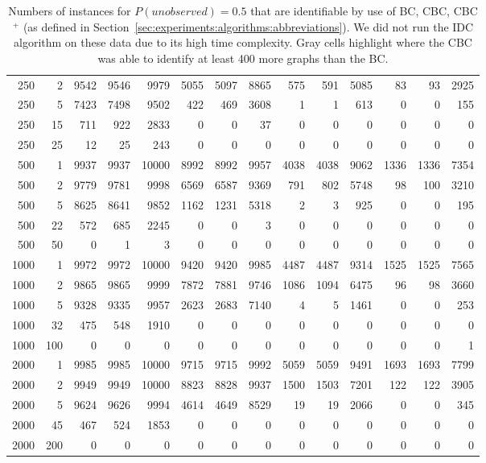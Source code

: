 \begin{table}
\begin{center}
\begin{tabular}{|rr | rrr| rrr| rrr| rrr|}
250&2&
9542&9546&9979&5055&5097&8865&575&591&5085&83&93&2925\\
250&5&
7423&7498&9502&422&469&3608&1&1&613&0&0&155\\
250&15&
711&922&2833&          0&0&37&        0&0&0&          0&0&0\\
250&25&
12&25&243&0&0&0&0&0&0&0&0&0\\
\hline
500&1&
9937&9937&10000&8992&8992&9957&4038&4038&9062&1336&1336&7354\\
500&2&
9779&9781&9998&6569&6587&9369&791&802&5748&98&100&3210\\
500&5&
8625&8641&9852&1162&1231&5318&2&3&925&0&0&195\\
500&22&
572&685&2245&0&0&3&0&0&0&0&0&0\\
500&50&
0&1&3&0&0&0&0&0&0&0&0&0\\
\hline
1000&1&
9972&9972&10000&9420&9420&9985&4487&4487&9314&1525&1525&7565\\
1000&2&
9865&9865&9999&7872&7881&9746&1086&1094&6475&96&98&3660\\
1000&5&
9328&9335&9957&2623&2683&7140&4&5&1461&0&0&253\\
1000&32&
475&548&1910&0&0&0&0&0&0&0&0&0\\
1000&100&
0&0&0&0&0&0&0&0&0&0&0&1\\
\hline
2000&1&
9985&9985&10000&9715&9715&9992&5059&5059&9491&1693&1693&7799\\
2000&2&
9949&9949&10000&8823&8828&9937&1500&1503&7201&122&122&3905\\
2000&5&
9624&9626&9994&4614&4649&8529&19&19&2066&0&0&345\\
2000&45&
467&524&1853&0&0&0&0&0&0&0&0&0\\
2000&200&
0&0&0&0&0&0&0&0&0&0&0&0\\
\hline\end{tabular}
  \end{center}\vspace*{-3mm}
  \caption{Numbers of instances for $P(\textit{unobserved}) = 0.5$ that are identifiable 
    by use of BC, CBC, CBC$^+$ (as defined in Section~\ref{sec:experiments:algorithms:abbreviations}). 
    We did not run the IDC algorithm on these data due to its high time complexity.
     Gray cells highlight where the CBC was able to identify at least 400 more graphs than the BC.
}\label{table:global:stat:unobs0.5:count}
  \end{table}
